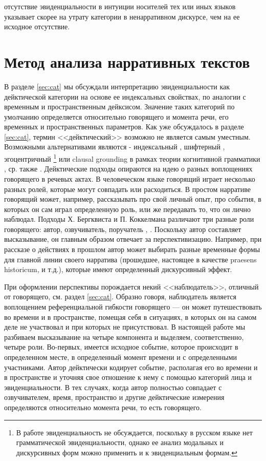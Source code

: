 отсутствие эвиденциальности в интуиции носителей тех или иных языков указывает скорее на утрату категории в ненарративном дискурсе, чем на ее исходное отсутствие.

\section{Метод анализа нарративных текстов} \label{sec:methodanalysis}

В разделе \ref{sec:cat} мы обсуждали интерпретацию эвиденциальности как дейктической категории на основе ее индексальных свойствах, по аналогии с временным и пространственным дейксисом. Значение таких категорий по умолчанию определяется относительно говорящего и момента речи, его временных и пространственных параметров. Как уже обсуждалось в разделе \ref{sec:cat}, термин <<дейктический>> возможно не является самым уместным. Возможными альтернативами являются - индексальный \citep{hanks2014}, шифтерный \citep{jakobson1957}, эгоцентричный \citep{paducheva2010}\footnote{В работе \citep{paducheva2010} эвиденциальность не обсуждается, поскольку в русском языке нет грамматической эвиденциальности, однако ее анализ модальных и дискурсивных форм можно применить и к эвиденциальным формам.} или clausal grounding в рамках теории когнитивной грамматики \citep{langacker2017}, ср. также \citep{boye2018}. Дейктические подходы опираются на идею о разных воплощениях говорящего в речевых актах. В человеческом языке говорящий играет несколько разных ролей, которые могут совпадать или расходиться. В простом нарративе говорящий может, например, рассказывать про свой личный опыт, про события, в которых он сам играл определенную роль, или же передавать то, что он лично наблюдал. Подходы Х. Бергквиста и П. Коккелмана различают три разные роли говорящего: автор, озвучиватель, поручатель \citep{bergqvist2018}, \citep{kockelman2004}. Поскольку автор составляет высказывание, он главным образом отвечает за перспективизацию. Например, при рассказе о действиях в прошлом автор может выбирать разные временные формы для главной линии своего нарратива (прошедшее, настоящее в качестве praesens historicum, и т.д.), которые имеют определенный дискурсивный эффект. 
\par При оформлении перспективы порождается некий  <<наблюдатель>>, отличный от говорящего, см. раздел \ref{sec:cat}. Образно говоря, наблюдатель является воплощением референциальной гибкости говорящего --- он может путешествовать во времени и в пространстве, помещая себя в ситуациях, в которых он на самом деле не участвовал и при которых не присутствовал. В настоящей работе мы разбиваем высказывание на четыре компонента и выделяем, соответственно, четыре роли. Во-первых, имеется исходное событие, которое происходит в определенном месте, в определенный момент времени и с определенными участниками. Автор дейктически кодирует событие, располагая его во времени и в пространстве и уточняя свое отношение к нему с помощью категорий лица и эвиденциальности. В тех случаях, когда автор полностью совпадает с озвучивателем, время, пространство и другие дейктические измерения определяются относительно момента речи, то есть говорящего.


